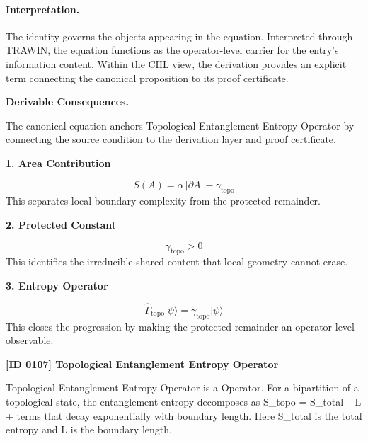 \paragraph{Interpretation.}
The identity governs the objects appearing in the equation. Interpreted through TRAWIN, the equation functions as the operator-level carrier for the entry’s information content. Within the CHL view, the derivation provides an explicit term connecting the canonical proposition to its proof certificate.

\par\vspace{0.35em}
\noindent\textbf{Derivable Consequences.}\quad
\begingroup
\footnotesize
\raggedright
The canonical equation anchors Topological Entanglement Entropy Operator by connecting the source condition to the derivation layer and proof certificate.
\par\endgroup

\noindent\textbf{1. Area Contribution}\par
\[
S(A)= \alpha\,\lvert \partial A\rvert - \gamma_{\mathrm{topo}}
\]
\noindent This separates local boundary complexity from the protected remainder.\par
\noindent\textbf{2. Protected Constant}\par
\[
\gamma_{\mathrm{topo}} > 0
\]
\noindent This identifies the irreducible shared content that local geometry cannot erase.\par
\noindent\textbf{3. Entropy Operator}\par
\[
\widehat{\Gamma}_{\mathrm{topo}}\lvert\psi\rangle = \gamma_{\mathrm{topo}}\lvert\psi\rangle
\]
\noindent This closes the progression by making the protected remainder an operator-level observable.\par

\clearpage
\noindent\textbf{[ID 0107] Topological Entanglement Entropy Operator}\par
\vspace{0.35em}
\begingroup\small
{}
Topological Entanglement Entropy Operator is a Operator. For a bipartition of a topological state, the entanglement entropy decomposes as S\_topo = S\_total -- L + terms that decay exponentially with boundary length. Here S\_total is the total entropy and L is the boundary length.


